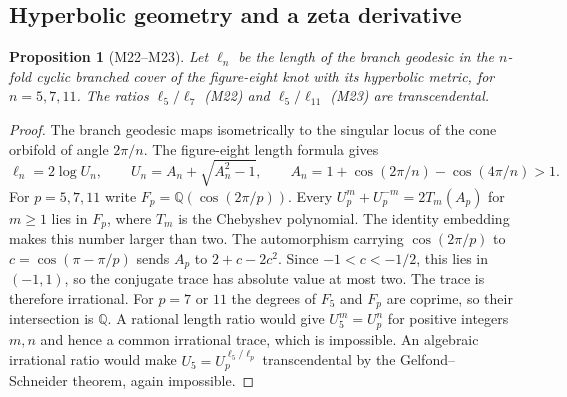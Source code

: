 \documentclass[11pt,a4paper]{article}
\newtheorem{proposition}[theorem]{Proposition}
\theoremstyle{definition}
\theoremstyle{remark}
\begin{document}
\subsection{Hyperbolic geometry and a zeta derivative}

\par\hypertarget{cat-M22}{}\label{page:M22}\hypertarget{cat-M23}{}\label{page:M23}
\begin{proposition}[M22--M23]
Let $\ell_n$ be the length of the branch geodesic in the $n$-fold cyclic
branched cover of the figure-eight knot with its hyperbolic metric, for
$n=5,7,11$. The ratios $\ell_5/\ell_7$ (M22) and $\ell_5/\ell_{11}$
(M23) are transcendental.
\end{proposition}
\begin{proof}
The branch geodesic maps isometrically to the singular locus of the cone
orbifold of angle $2\pi/n$. The figure-eight length formula
\cite{mMednykh} gives
\[
 \ell_n=2\log U_n,\qquad
 U_n=A_n+\sqrt{A_n^2-1},\qquad
 A_n=1+\cos(2\pi/n)-\cos(4\pi/n)>1 .
\]
For $p=5,7,11$ write $F_p=\mathbb Q(\cos(2\pi/p))$. Every
$U_p^m+U_p^{-m}=2T_m(A_p)$ for $m\ge1$ lies in $F_p$, where $T_m$ is
the Chebyshev polynomial. The identity embedding makes this number larger
than two. The automorphism carrying $\cos(2\pi/p)$ to
$c=\cos(\pi-\pi/p)$ sends $A_p$ to $2+c-2c^2$. Since $-1<c<-1/2$,
this lies in $(-1,1)$, so the conjugate trace has absolute value at most two.
The trace is therefore irrational. For $p=7$ or $11$ the degrees of $F_5$
and $F_p$ are coprime, so their intersection is $\mathbb Q$. A rational
length ratio would give $U_5^m=U_p^n$ for positive integers $m,n$ and hence
a common irrational trace, which is impossible. An algebraic irrational
ratio would make $U_5=U_p^{\ell_5/\ell_p}$ transcendental by the
Gelfond--Schneider theorem, again impossible.
\end{proof}
\end{document}
